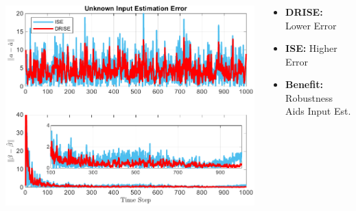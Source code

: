 \documentclass[handout, aspectratio=169]{beamer}
\begin{document}
\begin{frame}
    \frametitle{}
     \begin{columns}[T]
        \begin{column}{0.5\textwidth} %
             \includegraphics[width=\textwidth]{figs/AttackEstimationError.pdf} %
        \end{column}
        \begin{column}{0.5\textwidth} %
            \begin{tcolorbox}[colbacktitle=title1, title=\textbf{Analysis}]
                \begin{itemize}
                   \item<1-> \textbf{DRISE:} Lower Error \pause
                    \item<2-> \textbf{ISE:} Higher Error \pause
                    \item<3-> \textbf{Benefit:} Robustness Aids Input Est.
                \end{itemize}
            \end{tcolorbox}
        \end{column}
    \end{columns}
\end{frame}
\end{document}
